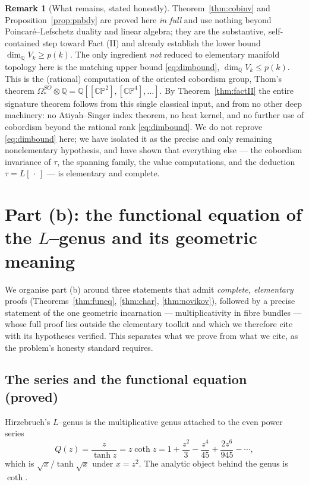 \documentclass[12pt]{article}
\theoremstyle{definition}
\newtheorem{remark}{Remark}
\begin{document}
\begin{remark}[What remains, stated honestly]\label{rem:honest}
Theorem~\ref{thm:cobinv} and Proposition~\ref{prop:pnbdy} are proved here \emph{in full}
and use nothing beyond Poincar\'e--Lefschetz duality and linear algebra; they are the
substantive, self-contained step toward Fact (II) and already establish the lower bound
$\dim_{\mathbb Q}V_k\ge p(k)$.  The only ingredient \emph{not} reduced to elementary
manifold topology here is the matching upper bound \eqref{eq:dimbound},
$\dim_{\mathbb Q}V_k\le p(k)$.  This is the (rational) computation of the oriented
cobordism group, Thom's theorem
$\Omega^{SO}_\ast\otimes\mathbb Q=\mathbb Q[[\mathbb{CP}^2],[\mathbb{CP}^4],\dots]$.
By Theorem~\ref{thm:factII} the entire signature theorem follows from this single
classical input, and from no other deep machinery: no Atiyah--Singer index theorem, no
heat kernel, and no further use of cobordism beyond the rational rank
\eqref{eq:dimbound}.  We do not reprove \eqref{eq:dimbound} here; we have isolated it as
the precise and only remaining nonelementary hypothesis, and have shown that everything
else --- the cobordism invariance of $\tau$, the spanning family, the value
computations, and the deduction $\tau=L[\,\cdot\,]$ --- is elementary and complete.
\end{remark}

\bigskip

\section{Part (b): the functional equation of the $L$--genus and its geometric
meaning}\label{sec:partb}

We organise part (b) around three statements that admit \emph{complete, elementary}
proofs (Theorems~\ref{thm:funeq}, \ref{thm:char}, \ref{thm:novikov}), followed by a
precise statement of the one geometric incarnation --- multiplicativity in fibre bundles
--- whose full proof lies outside the elementary toolkit and which we therefore cite with
its hypotheses verified. This separates what we prove from what we cite, as the problem's
honesty standard requires.

\subsection*{The series and the functional equation (proved)}

Hirzebruch's $L$--genus is the multiplicative genus attached to the even power series
\[
Q(z)=\frac{z}{\tanh z}=z\coth z
=1+\frac{z^2}{3}-\frac{z^4}{45}+\frac{2z^6}{945}-\cdots ,
\tag{10}\label{eq:Qseries}
\]
which is $\sqrt{x}/\tanh\sqrt{x}$ under $x=z^2$. The analytic object behind the genus is
$\coth$.
\end{document}
